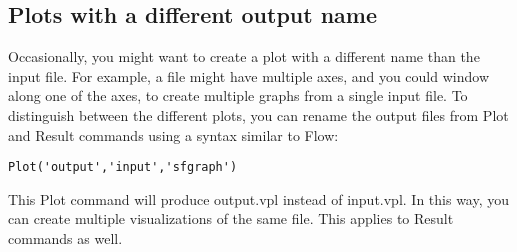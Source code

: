 \subsection{Plots with a different output name}

Occasionally, you might want to create a plot with a different name than the input file.  For example, a file might have multiple axes, and you could window along one of the axes, to create multiple graphs from a single input file.  To distinguish between the different plots, you can rename the output files from Plot and Result commands using a syntax similar to Flow:
\begin{verbatim}
Plot('output','input','sfgraph')
\end{verbatim}
This Plot command will produce output.vpl instead of input.vpl.  In this way, you can create multiple visualizations of the same file. This applies to Result commands as well.
